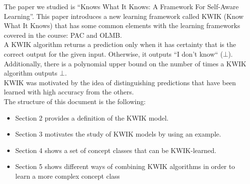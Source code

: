 The paper we studied is ``Knows What It Knows: A Framework For Self-Aware Learning''\cite{KWIK}.
This paper introduces a new learning framework called KWIK (Know What It Knows) that has some common elements with 
the learning frameworks covered in the course: PAC and OLMB.\\

A KWIK algorithm returns a prediction only when it has certainty that is the correct output for the given input. Otherwise, it outputs
``I don't know`` ($\bot$). Additionally, there is a polynomial upper bound on the number of times a KWIK algorithm outputs $\bot$.\\

KWIK was motivated by the idea of distinguishing predictions that have been learned with high accuracy from the others. \\

The structure of this document is the following:
\begin{itemize}
  \item Section 2 provides a definition of the KWIK model.
  \item Section 3 motivates the study of KWIK models by using an example.
  \item Section 4 shows a set of concept classes that can be KWIK-learned.
  \item Section 5 shows different ways of combining KWIK algorithms in order to learn a more complex concept class
\end{itemize}
